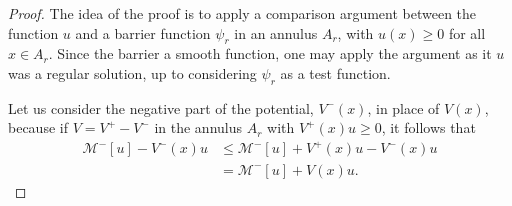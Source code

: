 \documentclass[11pt]{article}
\begin{document}
\begin{proof}
The idea of the proof is to apply a comparison argument between the function \(u\) and a barrier function \(\psi_r\) in an annulus \(A_r\), with \(u(x) \geq 0\) for all \(x\in A_r\). Since the barrier a smooth function, one may apply the argument as it $u$ was a regular solution, up to considering \(\psi_r\) as a test function. 

Let us consider the negative part of the potential, \(V^{-}(x)\), in place of \(V(x)\), because if \(V = V^{+}-V^{-}\) in the annulus \(A_r\) with \(V^{+}(x)u \geq 0\), it follows that
\begin{align*}
    \mathcal{M}^{-}[u]-V^{-}(x)u &\leq \mathcal{M}^{-}[u] + V^{+}(x)u - V^{-}(x)u \\
   & = \mathcal{M}^{-}[u] + V(x)u.
\end{align*}


\end{proof}
\end{document}
